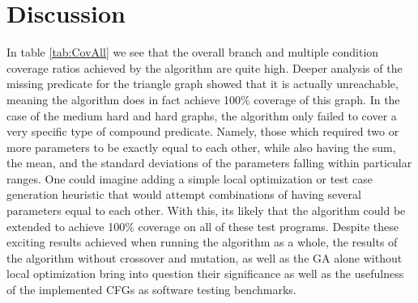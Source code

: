 \documentclass[runningheads]{llncs}
\begin{document}
\FloatBarrier
\newpage
\section{Discussion}
In table \ref{tab:CovAll} we see that the overall branch and multiple condition coverage ratios achieved by the algorithm are quite high. Deeper analysis of the missing predicate for the triangle graph showed that it is actually unreachable, meaning the algorithm does in fact achieve 100\% coverage of this graph. In the case of the medium hard and hard graphs, the algorithm only failed to cover a very specific type of compound predicate. Namely, those which required two or more parameters to be exactly equal to each other, while also having the sum, the mean, and the standard deviations of the parameters falling within particular ranges. One could imagine adding a simple local optimization or test case generation heuristic that would attempt combinations of having several parameters equal to each other. With this, its likely that the algorithm could be extended to achieve 100\% coverage on all of these test programs. Despite these exciting results achieved when running the algorithm as a whole, the results of the algorithm without crossover and mutation, as well as the GA alone without local optimization bring into question their significance as well as the usefulness of the implemented CFGs as software testing benchmarks.

\end{document}
